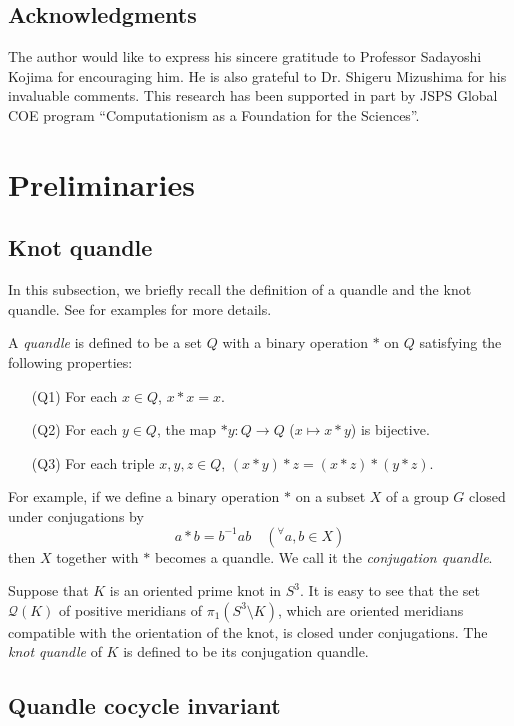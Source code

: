 \documentclass[12pt]{amsart}
\theoremstyle{definition}
\begin{document}
\subsection*{Acknowledgments}
The author would like to express his sincere gratitude to Professor Sadayoshi Kojima for encouraging him.
He is also grateful to Dr. Shigeru Mizushima for his invaluable comments.
This research has been supported in part by JSPS Global COE program ``Computationism as a Foundation for the Sciences''.

\section{Preliminaries}\label{sec:preliminaries}

\subsection{Knot quandle}\label{subsec:knot_quandle}

In this subsection, we briefly recall the definition of a quandle and the knot quandle.
See \cite{FR1, Joyce1, Matveev1} for examples for more details.

A {\it quandle} is defined to be a set $Q$ with a binary operation $\ast$ on $Q$ satisfying the following properties:
\begin{itemize}
\item[(Q1)] For each $x \in Q$, $x \ast x = x$.
\item[(Q2)] For each $y \in Q$, the map $\ast y : Q \rightarrow Q$ ($x \mapsto x \ast y$) is bijective.
\item[(Q3)] For each triple $x,y,z \in Q$, $(x \ast y) \ast z = (x \ast z) \ast (y \ast z)$.
\end{itemize}
For example, if we define a binary operation $\ast$ on a subset $X$ of a group $G$ closed under conjugations by
\[
a \ast b = b^{-1}ab \quad ({}^{\forall} a, b \in X)
\]
then $X$ together with $\ast$ becomes a quandle.
We call it the {\it conjugation quandle}.

Suppose that $K$ is an oriented prime knot in $S^{3}$.
It is easy to see that the set $\mathcal{Q}(K)$ of positive meridians of $\pi_{1}(S^{3} \setminus K)$, which are oriented meridians compatible with the orientation of the knot, is closed under conjugations.
The {\it knot quandle} of $K$ is defined to be its conjugation quandle.

\subsection{Quandle cocycle invariant}\label{subsec:quandle_cocycle_invariant}
\end{document}
